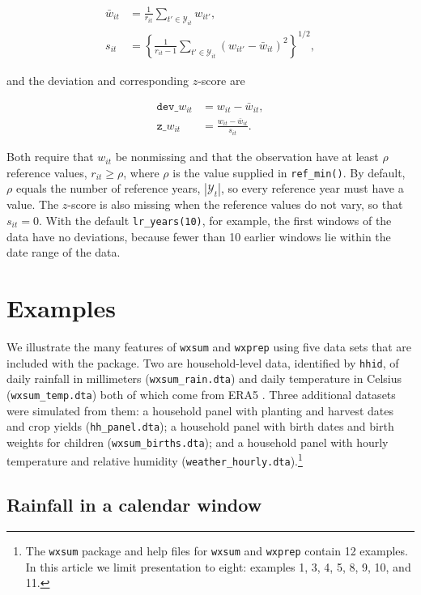 \begin{align}
	\bar{w}_{it} & = \frac{1}{r_{it}} \sum_{t' \in \mathcal{Y}_{it}} w_{it'} , \\
	s_{it} & = \left\{ \frac{1}{r_{it} - 1} \sum_{t' \in \mathcal{Y}_{it}} \left( w_{it'} - \bar{w}_{it} \right)^2 \right\}^{1/2} ,
\end{align}

\noindent and the deviation and corresponding $z$-score are

\begin{align}
	\texttt{dev\_}w_{it} & = w_{it} - \bar{w}_{it} , \\
	\texttt{z\_}w_{it} & = \frac{w_{it} - \bar{w}_{it}}{s_{it}} .
\end{align}

\noindent Both require that $w_{it}$ be nonmissing and that the observation have at least $\rho$ reference values, $r_{it} \geq \rho$, where $\rho$ is the value supplied in \texttt{ref\_min()}. By default, $\rho$ equals the number of reference years, $|\mathcal{Y}_t|$, so every reference year must have a value. The $z$-score is also missing when the reference values do not vary, so that $s_{it} = 0$. With the default \texttt{lr\_years(10)}, for example, the first windows of the data have no deviations, because fewer than 10 earlier windows lie within the date range of the data.

\section{Examples} \label{sec:examples}

We illustrate the many features of \texttt{wxsum} and \texttt{wxprep} using five data sets that are included with the package. Two are household-level data, identified by \texttt{hhid}, of daily rainfall in millimeters (\texttt{wxsum\_rain.dta}) and daily temperature in Celsius (\texttt{wxsum\_temp.dta}) both of which come from ERA5 \citep{ERA5}. Three additional datasets were simulated from them: a household panel with planting and harvest dates and crop yields (\texttt{hh\_panel.dta}); a household panel with birth dates and birth weights for children (\texttt{wxsum\_births.dta}); and a household panel with hourly temperature and relative humidity (\texttt{weather\_hourly.dta}).\footnote{The \texttt{wxsum} package and help files for \texttt{wxsum} and \texttt{wxprep} contain 12 examples. In this article we limit presentation to eight: examples 1, 3, 4, 5, 8, 9, 10, and 11.}

\subsection{Rainfall in a calendar window} \label{sec:ex-rain}

